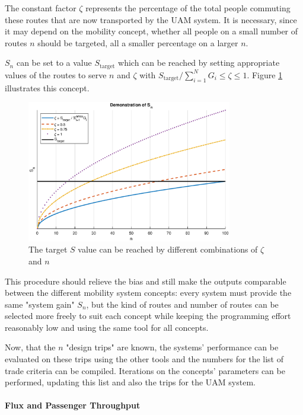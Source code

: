 The constant factor $\zeta$ represents the percentage of the total people commuting these routes that are now transported by the UAM system. It is necessary, since it may depend on the mobility concept, whether all people on a small number of routes $n$ should be targeted, all a smaller percentage on a larger $n$.

$S_n$ can be set to a value $S_{\text{target}}$ which can be reached by setting appropriate values of the routes to serve $n$ and $\zeta$ with $S_{\text{target}} / \sum_{i=1}^{N}{G_i}\leq \zeta \leq 1$. Figure \ref{fig:zeta_n_demo} illustrates this concept. 

\begin{figure}
    \centering
    \includegraphics[width=0.8\textwidth]{Figures/S_nDemo.eps}
    \captionsetup{justification=centering}
    \caption{The target $S$ value can be reached by different combinations of $\zeta$ and $n$}
    \label{fig:zeta_n_demo}
\end{figure}


This procedure should relieve the bias and still make the outputs comparable between the different mobility system concepts: every system must provide the same "system gain" $S_n$, but the kind of routes and number of routes can be selected more freely to suit each concept while keeping the programming effort reasonably low and using the same tool for all concepts.

Now, that the $n$ "design trips" are known, the systems' performance can be evaluated on these trips using the other tools and the numbers for the list of trade criteria can be compiled. Iterations on the concepts' parameters can be performed, updating this list and also the trips for the UAM system.


\paragraph{Flux and Passenger Throughput}

